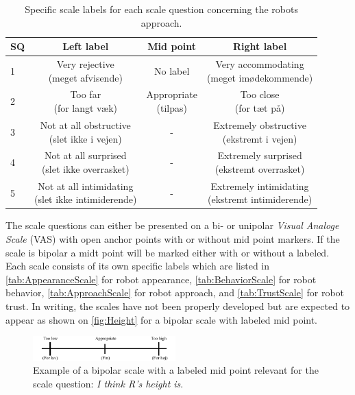 \begin{table}[H]
	\centering
\caption{Specific scale labels for each scale question concerning the robots approach.}
	\label{tab:ApproachScale} 
	\begin{tabular}{l|c|c|c}
		SQ     & Left label & Mid point & Right label \\\hline
		1   & \makecell{Very rejective \\(meget afvisende)} & No label & \makecell{Very accommodating \\(meget imødekommende)}          \\\hline
		2   & \makecell{Too far \\(for langt væk)} & \makecell{Appropriate \\(tilpas)} & \makecell{Too close \\(for tæt på)}          \\\hline
		3   & \makecell{Not at all obstructive \\(slet ikke i vejen)}& -  & \makecell{Extremely obstructive \\(ekstremt i vejen)}  \\\hline
	 	4   & \makecell{Not at all surprised \\(slet ikke overrasket)} &  -  & \makecell{Extremely surprised \\(ekstremt overrasket)}       \\\hline
		5   & \makecell{Not at all intimidating \\(slet ikke intimiderende)} & - & \makecell{Extremely intimidating \\(ekstremt intimiderende)}           
	\end{tabular}
\end{table}
\noindent
%
The scale questions can either be presented on a bi- or unipolar \textit{Visual Analoge Scale} (VAS) with open anchor points with or without mid point markers. If the scale is bipolar a midt point will be marked either with or without a labeled. Each scale consists of its own specific labels which are listed in \autoref{tab:AppearanceScale} for robot appearance, \autoref{tab:BehaviorScale} for robot behavior, \autoref{tab:ApproachScale} for robot approach, and \autoref{tab:TrustScale} for robot trust. In writing, the scales have not been properly developed but are expected to appear as shown on \autoref{fig:Height} for a bipolar scale with labeled mid point. 
%
\begin{figure}[H]
\centering
\includegraphics[width = 0.49\textwidth]{Figure/HeightHoejde} 
\caption{Example of a bipolar scale with a labeled mid point relevant for the scale question: \textit{I think R's height is}.}
\label{fig:Height}
\end{figure}
